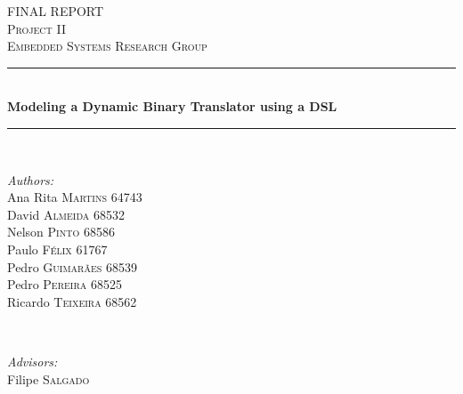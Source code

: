 \documentclass[12pt]{article}
\begin{document}
\begin{titlepage}

\newcommand{\HRule}{\rule{\linewidth}{0.5mm}} %

\center %
 

\textsc{\LARGE FINAL REPORT}\\[1.0cm] %
\textsc{\Large Project II}\\[0.5cm] %
\textsc{\large Embedded Systems Research Group}\\[0.5cm] %


\HRule \\[1.2cm]
{ \Huge \bfseries 
Modeling a Dynamic Binary Translator using a DSL}\\[1.0cm] %

\HRule \\[2.0cm]
 
\begin{minipage}{0.4\textwidth}
\begin{flushleft} \large
\emph{Authors:}\\
Ana Rita \textsc{Martins} 64743 \\
David \textsc{Almeida} 68532 \\
Nelson \textsc{Pinto} 68586 \\
Paulo \textsc{Félix} 61767  \\
Pedro \textsc{Guimarães} 68539 \\
Pedro \textsc{Pereira} 68525 \\
Ricardo \textsc{Teixeira} 68562

\end{flushleft}
\end{minipage}
~
\begin{minipage}{0.4\textwidth}
\begin{flushright} \large
 \emph{Advisors:} \\
Filipe \textsc{Salgado} \\ %
\end{flushright}
\end{minipage}\\[2cm]


\end{titlepage}
\end{document}
